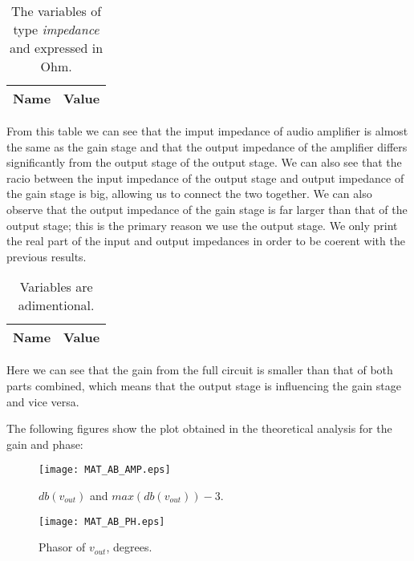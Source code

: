 \begin{table}[h]
  \centering
  \begin{tabular}{|l|r|}
    \hline    
    {\bf Name} & {\bf Value} \\ \hline
    
  \end{tabular}
  \caption{The variables of type {\it impedance} and expressed in Ohm.}
  \label{tab:TEO_IMP}
\end{table}

From this table we can see that the imput impedance of audio amplifier is almost the same as the gain stage and that the output impedance of the amplifier differs significantly from the output stage of the output stage. We can also see that the racio between the input impedance of the output stage and output impedance of the gain stage is big, allowing us to connect the two together. We can also observe that the output impedance of the gain stage is far larger than that of the output stage; this is the primary reason we use the output stage. We only print the real part of the input and output impedances in order to be coerent with the previous results.

\begin{table}[h]
  \centering
  \begin{tabular}{|l|r|}
    \hline    
    {\bf Name} & {\bf Value} \\ \hline
    
  \end{tabular}
  \caption{Variables are adimentional.}
  \label{tab:TEO_RES}
\end{table}

Here we can see that the gain from the full circuit is smaller than that of both parts combined, which means that the output stage is influencing the gain stage and vice versa.

\newpage

The following figures show the plot obtained in the theoretical analysis for the gain and phase:

\begin{figure}[h] \centering
	\texttt{[image: MAT\_AB\_AMP.eps]}
	\caption{$db(v_{out})$ and $max(db(v_{out}))-3$.}
\end{figure}

\begin{figure}[h] \centering
	\texttt{[image: MAT\_AB\_PH.eps]}
	\caption{Phasor of $v_{out}$, degrees.}
\end{figure}
